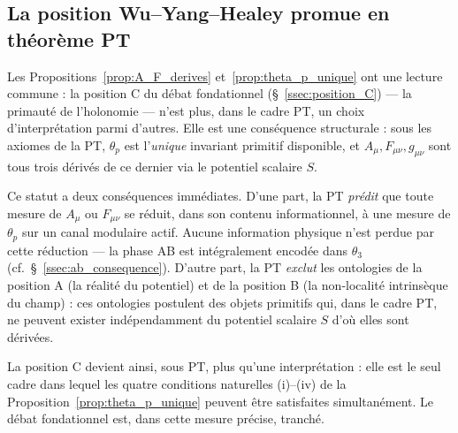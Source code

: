 \subsection{La position Wu--Yang--Healey promue en théorème PT}
\label{ssec:wu_yang_promu}

Les Propositions~\ref{prop:A_F_derives}
et~\ref{prop:theta_p_unique} ont une lecture commune : la
position C du débat fondationnel
(\S~\ref{ssec:position_C}) --- la primauté de l'holonomie ---
n'est plus, dans le cadre PT, un choix d'interprétation parmi
d'autres. Elle est une conséquence structurale : sous les axiomes
de la PT, $\theta_p$ est l'\emph{unique} invariant primitif
disponible, et $A_\mu, F_{\mu\nu}, g_{\mu\nu}$ sont tous trois
dérivés de ce dernier via le potentiel scalaire $S$.

Ce statut a deux conséquences immédiates. D'une part, la PT
\emph{prédit} que toute mesure de $A_\mu$ ou $F_{\mu\nu}$ se
réduit, dans son contenu informationnel, à une mesure de $\theta_p$
sur un canal modulaire actif. Aucune information physique n'est
perdue par cette réduction --- la phase AB est intégralement
encodée dans $\theta_3$ (cf.\ \S~\ref{ssec:ab_consequence}). D'autre
part, la PT \emph{exclut} les ontologies de la position A (la
réalité du potentiel) et de la position B (la non-localité
intrinsèque du champ) : ces ontologies postulent des objets
primitifs qui, dans le cadre PT, ne peuvent exister
indépendamment du potentiel scalaire $S$ d'où elles sont dérivées.

La position C devient ainsi, sous PT, plus qu'une interprétation :
elle est le seul cadre dans lequel les quatre conditions
naturelles (i)--(iv) de la
Proposition~\ref{prop:theta_p_unique} peuvent être satisfaites
simultanément. Le débat fondationnel est, dans cette mesure
précise, tranché.
